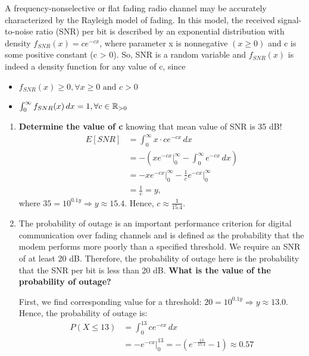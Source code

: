 \documentclass{homework}
\begin{document}
\exercise*
A frequency-nonselective or flat fading radio channel may be accurately characterized by the Rayleigh model of fading. In this model, the received signal-to-noise ratio (SNR) per bit is described by an exponential distribution with density $f_{SNR}(x) = ce^{-cx}$, where parameter x is nonnegative $(x \geq 0)$ and c is some positive constant (c > 0). So, SNR is a random variable and $f_{SNR}(x)$ is indeed a density function for any value of c, since
\begin{itemize}
	\item $f_{SNR}(x) \geq 0, \forall x \geq 0 \text{ and } c > 0$
	\item $\int_{0}^{\infty} f_{SNR}(x) \,dx = 1, \forall c \in \mathbb R_{> 0}$ 
\end{itemize}
\begin{enumerate}[label=(\alph*)]
	\item \textbf{Determine the value of c} knowing that mean value of SNR is 35 dB!
	\begin{align*}
	E[SNR] &= \int_0^\infty x\cdot ce^{-cx}\,dx \\
	&= -(xe^{-cx}\big|_0^\infty - \int_0^\infty e^{-cx}\,dx) \\
	&= -xe^{-cx}\big|_0^\infty - \frac{1}{c} e^{-cx}\big|_0^\infty \\
	&=\frac{1}{c} = y,
	\end{align*}
where $35 = 10^{0.1y} \Rightarrow y \approx 15.4$. Hence, $c \approx \frac{1}{15.4}.$
	\item The probability of outage is an important performance criterion for digital communication over fading channels and is defined as the probability that the modem performs more poorly than a specified threshold. We require an SNR of at least 20 dB. Therefore, the probability of outage here is the probability that the SNR per bit is less than 20 dB. \textbf{What is the value of the probability of outage?}

	First, we find corresponding value for a threshold: $20 = 10^{0.1y} \Rightarrow y \approx 13.0$. Hence, the probability of outage is:
\begin{align*}
	P(X\leq13) &= \int_0^{13} ce^{-cx}\,dx \\
	&=-e^{-cx}\big|_0^{13} = -(e^{-\frac{13}{15.4}} - 1) \approx 0.57
\end{align*}
\end{enumerate}
\end{document}
